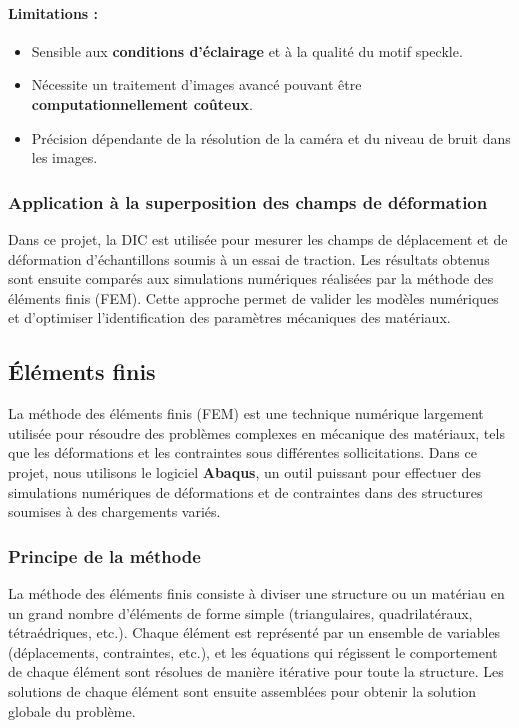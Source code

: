 \documentclass[12pt,a4paper]{article}
\begin{document}
\paragraph{Limitations :}
\begin{itemize}
    \item Sensible aux \textbf{conditions d’éclairage} et à la qualité du motif speckle.
    \item Nécessite un traitement d’images avancé pouvant être \textbf{computationnellement coûteux}.
    \item Précision dépendante de la résolution de la caméra et du niveau de bruit dans les images.
\end{itemize}

\subsubsection{Application à la superposition des champs de déformation}
Dans ce projet, la DIC est utilisée pour mesurer les champs de déplacement et de déformation d’échantillons soumis à un essai de traction. Les résultats obtenus sont ensuite comparés aux simulations numériques réalisées par la méthode des éléments finis (FEM). Cette approche permet de valider les modèles numériques et d’optimiser l’identification des paramètres mécaniques des matériaux.



\subsection{Éléments finis}
La méthode des éléments finis (FEM) est une technique numérique largement utilisée pour résoudre des problèmes complexes en mécanique des matériaux, tels que les déformations et les contraintes sous différentes sollicitations. Dans ce projet, nous utilisons le logiciel \textbf{Abaqus}, un outil puissant pour effectuer des simulations numériques de déformations et de contraintes dans des structures soumises à des chargements variés.

\subsubsection{Principe de la méthode}
La méthode des éléments finis consiste à diviser une structure ou un matériau en un grand nombre d'éléments de forme simple (triangulaires, quadrilatéraux, tétraédriques, etc.). Chaque élément est représenté par un ensemble de variables (déplacements, contraintes, etc.), et les équations qui régissent le comportement de chaque élément sont résolues de manière itérative pour toute la structure. Les solutions de chaque élément sont ensuite assemblées pour obtenir la solution globale du problème.
\end{document}
